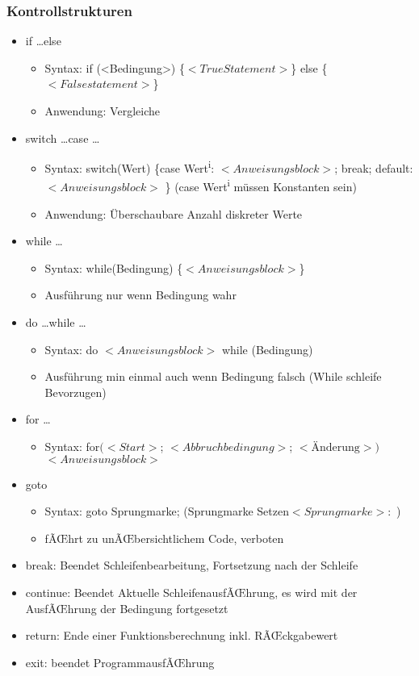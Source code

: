 \documentclass[10pt,a5paper]{article}
\begin{document}
\subsubsection{Kontrollstrukturen}
\begin{itemize}
\item if \dots else \begin{itemize}
\item Syntax: if (<Bedingung>) \{\ensuremath{<TrueStatement>}\} else \{\ensuremath{<Falsestatement>}\}
\item Anwendung: Vergleiche
\end{itemize}
\item switch \dots case \dots\begin{itemize}
\item Syntax: switch(Wert) \{case Wert\textsuperscript{i}: \ensuremath{<Anweisungsblock>}; break; default:\ensuremath{ <Anweisungsblock>} \} (case Wert\textsuperscript{i} müssen Konstanten sein)
\item Anwendung: Überschaubare Anzahl diskreter Werte
\end{itemize}
\item while \dots\begin{itemize}
\item Syntax: while(Bedingung) \{\ensuremath{<Anweisungsblock>}\}
\item Ausführung nur wenn Bedingung wahr
\end{itemize}
\item do \dots while \dots\begin{itemize}
\item Syntax: do \ensuremath{<Anweisungsblock>} while (Bedingung)
\item Ausführung min einmal auch wenn Bedingung falsch (While schleife Bevorzugen)
\end{itemize}
\item for \dots\begin{itemize}
\item Syntax: \subitem for\ensuremath{(<Start>}; \ensuremath{<Abbruchbedingung>}; \ensuremath{ <\text{Änderung}> )} \ensuremath{<Anweisungsblock>}
\end{itemize}

\item goto\begin{itemize}
\item Syntax: goto Sprungmarke; (Sprungmarke Setzen\ensuremath{<Sprungmarke>:} )
\item fÃŒhrt zu unÃŒbersichtlichem Code, verboten
\end{itemize}
\item break: Beendet Schleifenbearbeitung, Fortsetzung nach der Schleife
\item continue: Beendet Aktuelle SchleifenausfÃŒhrung, es wird mit der AusfÃŒhrung der Bedingung fortgesetzt
\item return: Ende einer Funktionsberechnung inkl. RÃŒckgabewert
\item exit: beendet ProgrammausfÃŒhrung
\end{itemize}
\end{document}

